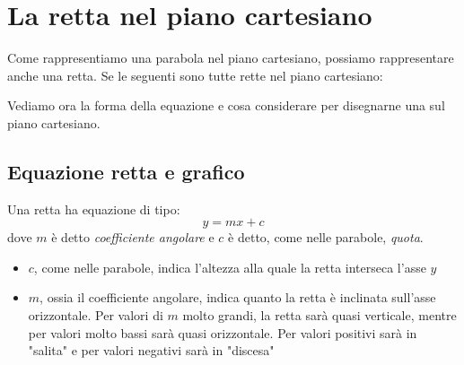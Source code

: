 \section{La retta nel piano cartesiano}
Come rappresentiamo una parabola nel piano cartesiano, possiamo rappresentare anche una retta. Se le seguenti sono tutte rette nel piano cartesiano:
\begin{center}
\end{center}
Vediamo ora la forma della equazione e cosa considerare per disegnarne una sul piano cartesiano.

\subsection{Equazione retta e grafico}
Una retta ha equazione di tipo:
\[
	y= mx + c
\]
dove $ m $ è detto \textit{coefficiente angolare} e $ c $ è detto, come nelle parabole, \textit{quota}.
\begin{itemize}
	\item $ c $, come nelle parabole, indica l'altezza alla quale la retta interseca l'asse $ y $
	\item $ m $, ossia il coefficiente angolare, indica quanto la retta è inclinata sull'asse orizzontale. Per valori di $ m $ molto grandi, la retta sarà quasi verticale, mentre per valori molto bassi sarà quasi orizzontale. Per valori positivi sarà in "salita" e per valori negativi sarà in "discesa"
\end{itemize}

